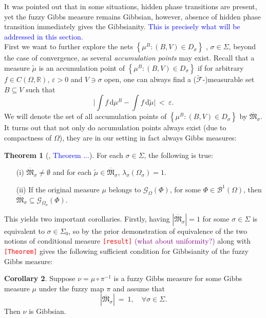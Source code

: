 \documentclass[12pt]{article}
\newcommand{\BB}{\mathscr{B}}
\renewcommand{\d}{\mathrm{d}}
\newcommand{\F}{\mathcal{F}}
\newcommand{\G}{\mathcal{G}}
\newcommand{\MM}{\mathfrak{M}}
\newcommand{\R}{\mathbb{R}}
\newcommand{\set}[1]{\left\{#1\right\}}
\newcommand{\1}{\mathbbm{1}}
\newcommand{\5}{\vspace{0.5cm}}
\renewcommand{\tilde}{\widetilde}
\theoremstyle{definition}
\newtheorem{thm}{Theorem}[section]
\newtheorem{cor}[thm]{Corollary}
\begin{document}
It was pointed out that in some situations, hidden phase transitions are present, yet the fuzzy Gibbs measure remains Gibbsian, however, absence of hidden phase transition immediately gives the Gibbsianity. \textcolor{blue}{This is precisely what will be addressed in this section.} \\

First we want to further explore the nets $\set{\mu^B:(B,V)\in D_\sigma}$ , $\sigma\in\Sigma$, beyond the case of convergence, as several \textit{accumulation points} may exist. Recall that a measure $\tilde{\mu}$ is an accumulation point of $\set{\mu^B:(B,V)\in D_\sigma}$ if for arbitrary $f\in C(\Omega,\R)$, $\varepsilon>0$ and $V\ni \sigma$ open, one can always find a ($\tilde{\F}$-)measurable set $B\subseteq V$ such that 
$$\Big|\int f\,\d\mu^B - \int f\,\d\tilde{\mu}\Big| ~<~ \varepsilon.$$
We will denote the set of all accumulation points of $\set{\mu^B:(B,V)\in D_\sigma}$ by $\overline{\MM}_\sigma$. It turns out that not only do accumulation points always exist (due to compactness of $\Omega$), they are in our setting in fact always Gibbs measures:
\begin{thm}[\cite{Ber}, \textcolor{blue}{Theorem ...}]
For each $\sigma\in\Sigma$, the following is true:
\begin{itemize}
	\item[(i)] $\overline{\MM}_\sigma\neq \emptyset$ and for each $\tilde{\mu}\in\overline{\MM}_\sigma$, $\lambda_\sigma(\Omega_\sigma)=1$.
	\item[(ii)] If the original measure $\mu$ belongs to $\G_\Omega(\Phi)$, for some $\Phi\in\BB^1(\Omega)$, then $\overline{\MM}_\sigma\subseteq\G_{\Omega_\sigma}(\Phi)$.
\end{itemize}
\end{thm} 

This yields two important corollaries. Firstly, having $|\overline{\MM}_\sigma|=1$ for some $\sigma\in\Sigma$ is equivalent to $\sigma\in\Sigma_0$, so by the prior demonstration of equivalence of the two notions of conditional measure \textcolor{red}{\texttt{[result]}} \textcolor{purple}{(what about uniformity?)} along with \textcolor{red}{\texttt{[Theorem]}} gives the following sufficient condition for Gibbsianity of the fuzzy Gibbs measure:
\begin{cor}
Suppose $\nu=\mu\circ\pi^{-1}$ is a fuzzy Gibbs measure for some Gibbs measure $\mu$ under the fuzzy map $\pi$ and assume that 
$$|\overline{\MM}_\sigma| ~=~ 1, \quad \forall \sigma\in\Sigma.$$
Then $\nu$ is Gibbsian.
\end{cor}
\end{document}
